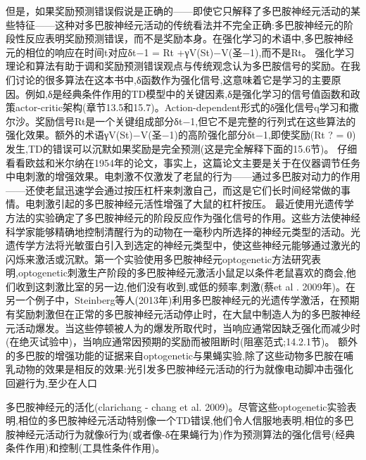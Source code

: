 但是，如果奖励预测错误假说是正确的——即使它只解释了多巴胺神经元活动的某些特征——这种对多巴胺神经元活动的传统看法并不完全正确:多巴胺神经元的阶段性反应表明奖励预测错误，而不是奖励本身。在强化学习的术语中,多巴胺神经元的相位的响应在时间t对应δt−1 = Rt +γV(St)−V(圣−1),而不是Rt。
强化学习理论和算法有助于调和奖励预测错误观点与传统观念认为多巴胺信号的奖励。在我们讨论的很多算法在这本书中,δ函数作为强化信号,这意味着它是学习的主要原因。例如,δ是经典条件作用的TD模型中的关键因素,δ是强化学习的信号值函数和政策actor-critic架构(章节13.5和15.7)。Action-dependent形式的δ强化信号q学习和撒尔沙。奖励信号Rt是一个关键组成部分δt−1,但它不是完整的行列式在这些算法的强化效果。额外的术语γV(St)−V(圣−1)的高阶强化部分δt−1,即使奖励(Rt ? = 0)发生,TD的错误可以沉默如果奖励是完全预测(这是完全解释下面的15.6节)。
仔细看看欧兹和米尔纳在1954年的论文，事实上，这篇论文主要是关于在仪器调节任务中电刺激的增强效果。电刺激不仅激发了老鼠的行为——通过多巴胺对动力的作用——还使老鼠迅速学会通过按压杠杆来刺激自己，而这是它们长时间经常做的事情。电刺激引起的多巴胺神经元活性增强了大鼠的杠杆按压。
最近使用光遗传学方法的实验确定了多巴胺神经元的阶段反应作为强化信号的作用。这些方法使神经科学家能够精确地控制清醒行为的动物在一毫秒内所选择的神经元类型的活动。光遗传学方法将光敏蛋白引入到选定的神经元类型中，使这些神经元能够通过激光的闪烁来激活或沉默。第一个实验使用多巴胺神经元optogenetic方法研究表明,optogenetic刺激生产阶段的多巴胺神经元激活小鼠足以条件老鼠喜欢的商会,他们收到这刺激比室的另一边,他们没有收到,或低的频率,刺激(蔡et al . 2009年)。在另一个例子中，Steinberg等人(2013年)利用多巴胺神经元的光遗传学激活，在预期有奖励刺激但在正常的多巴胺神经元活动停止时，在大鼠中制造人为的多巴胺神经元活动爆发。当这些停顿被人为的爆发所取代时，当响应通常因缺乏强化而减少时(在绝灭试验中)，当响应通常因预期的奖励而被阻断时(阻塞范式;14.2.1节)。
额外的多巴胺的增强功能的证据来自optogenetic与果蝇实验,除了这些动物多巴胺在哺乳动物的效果是相反的效果:光引发多巴胺神经元活动的行为就像电动脚冲击强化回避行为,至少在人口

多巴胺神经元的活化(clarichang - chang et al. 2009)。尽管这些optogenetic实验表明,相位的多巴胺神经元活动特别像一个TD错误,他们令人信服地表明,相位的多巴胺神经元活动行为就像δ行为(或者像-δ在果蝇行为)作为预测算法的强化信号(经典条件作用)和控制(工具性条件作用)。


